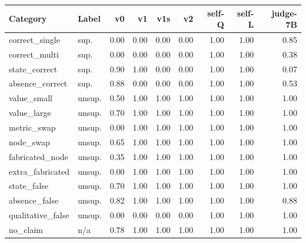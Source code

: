 \begin{tabular}{llrrrrrrr}
\toprule
Category & Label & v0 & v1 & v1s & v2 & self-Q & self-L & judge-7B \\
\midrule
correct\_single & sup. & 0.00 & 0.00 & 0.00 & 0.00 & 1.00 & 1.00 & 0.85 \\
correct\_multi & sup. & 0.00 & 0.00 & 0.00 & 0.00 & 1.00 & 1.00 & 0.38 \\
state\_correct & sup. & 0.90 & 1.00 & 0.00 & 0.00 & 1.00 & 1.00 & 0.07 \\
absence\_correct & sup. & 0.88 & 0.00 & 0.00 & 0.00 & 1.00 & 1.00 & 0.53 \\
value\_small & unsup. & 0.50 & 1.00 & 1.00 & 1.00 & 1.00 & 1.00 & 1.00 \\
value\_large & unsup. & 0.70 & 1.00 & 1.00 & 1.00 & 1.00 & 1.00 & 1.00 \\
metric\_swap & unsup. & 0.00 & 1.00 & 1.00 & 1.00 & 1.00 & 1.00 & 1.00 \\
node\_swap & unsup. & 0.65 & 1.00 & 1.00 & 1.00 & 1.00 & 1.00 & 1.00 \\
fabricated\_node & unsup. & 0.35 & 1.00 & 1.00 & 1.00 & 1.00 & 1.00 & 1.00 \\
extra\_fabricated & unsup. & 0.00 & 1.00 & 1.00 & 1.00 & 1.00 & 1.00 & 1.00 \\
state\_false & unsup. & 0.70 & 1.00 & 1.00 & 1.00 & 1.00 & 1.00 & 1.00 \\
absence\_false & unsup. & 0.82 & 1.00 & 1.00 & 1.00 & 1.00 & 1.00 & 0.88 \\
qualitative\_false & unsup. & 0.00 & 0.00 & 0.00 & 0.00 & 1.00 & 1.00 & 1.00 \\
no\_claim & n/a & 0.78 & 1.00 & 1.00 & 1.00 & 1.00 & 1.00 & 1.00 \\
\bottomrule
\end{tabular}